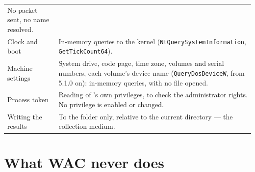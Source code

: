 \documentclass[11pt,a4paper,oneside]{report}
\begin{document}
\begin{longtable}{@{}L{4.3cm}L{10.1cm}@{}}
  No packet sent, no name resolved. \\
Clock and boot & In-memory queries to the kernel
  (\texttt{NtQuerySystemInformation}, \texttt{GetTickCount64}). \\
Machine settings & System drive, code page, time zone, volumes and serial
  numbers, each volume's device name (\texttt{QueryDosDeviceW}, from 5.1.0
  on): in-memory queries, with no file opened. \\
Process token & Reading of \wac{}'s own privileges, to check the administrator
  rights. No privilege is enabled or changed. \\
Writing the results & To the  folder only, relative to the current
  directory — the collection medium. \\
\bottomrule
\end{longtable}


\section{What WAC never does}
\end{document}
